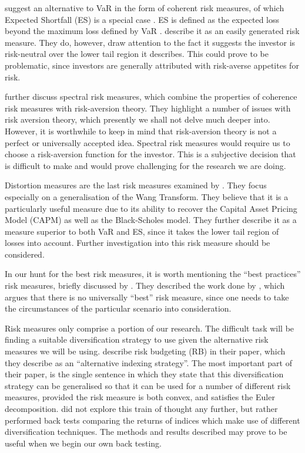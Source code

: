 \documentclass[12pt,a4paper]{article}
\begin{document}
\cite{dowd2006after} suggest an alternative to VaR in the form of coherent risk measures, of which Expected Shortfall (ES) is a special case \citep{ACERBI20021505}. ES is defined as the expected loss beyond the maximum loss defined by VaR \citep{consiglirisk}. \cite{dowd2006after} describe it as an easily generated risk measure. They do, however, draw attention to the fact it suggests the investor is risk-neutral over the lower tail region it describes. This could prove to be problematic, since investors are generally attributed with risk-averse appetites for risk.

\cite{dowd2006after} further discuss spectral risk measures, which combine the properties of coherence risk measures with risk-aversion theory. They highlight a number of issues with risk aversion theory, which presently we shall not delve much deeper into. However, it is worthwhile to keep in mind that risk-aversion theory is not a perfect or universally accepted idea. Spectral risk measures would require us to choose a risk-aversion function for the investor. This is a subjective decision that is difficult to make and would prove challenging for the research we are doing.

Distortion measures are the last risk measures examined by \cite{dowd2006after}. They focus especially on a generalisation of the Wang Transform. They believe that it is a particularly useful measure due to its ability to recover the Capital Asset Pricing Model (CAPM) as well as the Black-Scholes model. They further describe it as a measure superior to both VaR and ES, since it takes the lower tail region of losses into account. Further investigation into this risk measure should be considered.

In our hunt for the best risk measures, it is worth mentioning the ``best practices'' risk measures, briefly discussed by \cite{dowd2006after}. They described the work done by \cite{dhaene2003economic}, which argues that there is no universally ``best'' risk measure, since one needs to take the circumstances of the particular scenario into consideration.

Risk measures only comprise a portion of our research. The difficult task will be finding a suitable diversification strategy to use given the alternative risk measures we will be using. \cite{bruder2012managing} describe risk budgeting (RB) in their paper, which they describe as an ``alternative indexing strategy''. The most important part of their paper, is the single sentence in which they state that this diversification strategy can be generalised so that it can be used for a number of different risk measures, provided the risk measure is both convex, and satisfies the Euler decomposition. \cite{bruder2012managing} did not explore this train of thought any further, but rather performed back tests comparing the returns of indices which make use of different diversification techniques. The methods and results described may prove to be useful when we begin our own back testing. 
\end{document}
